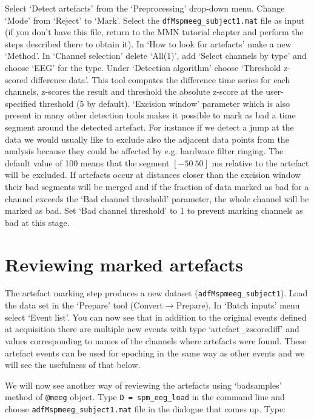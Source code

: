 Select `Detect artefacts' from the `Preprocessing' drop-down menu. Change `Mode' from `Reject' to `Mark'. Select the \texttt{dfMspmeeg\_subject1.mat} file as input (if you don't have this file, return to the MMN tutorial chapter and perform the steps described there to obtain it). In `How to look for artefacts' make a new `Method'. In `Channel selection' delete `All(1)', add `Select channels by type' and choose `EEG' for the type. Under `Detection algorithm' choose `Threshold z-scored difference data'. This tool computes the difference time series for each channels, z-scores the result and threshold the absolute z-score at the user-specified threshold (5 by default).  `Excision window' parameter which is also present in many other detection tools makes it possible to mark as bad a time segment around the detected artefact. For instance if we detect a jump at the data we would usually like to exclude also the adjacent data points from the analysis because they could be affected by e.g. hardware filter ringing. The default value of 100 means that the segment $[-50\ 50]$ ms relative to the artefact will be excluded. If artefacts occur at distances closer than the excision window their bad segments will be merged and if the fraction of data marked as bad for a channel exceeds the `Bad channel threshold' parameter, the whole channel will be marked as bad. Set `Bad channel threshold' to 1 to prevent marking channels as bad at this stage.

\section{Reviewing marked artefacts}

The artefact marking step produces a new dataset (\texttt{adfMspmeeg\_subject1}). Load the data set in the `Prepare' tool (Convert$\rightarrow$Prepare).  In `Batch inputs' menu select `Event list'. You can now see that in addition to the original events defined at acquisition there are multiple new events with type `artefact\_zscorediff' and values corresponding to names of the channels where artefacts were found. These artefact events can be used for epoching in the same way as other events and we will see the usefulness of that below. 

We will now see another way of reviewing the artefacts using `badsamples' method of \texttt{@meeg} object. Type \texttt{D = spm\_eeg\_load} in the command line and choose \texttt{adfMspmeeg\_subject1.mat} file in the dialogue that comes up. Type:

